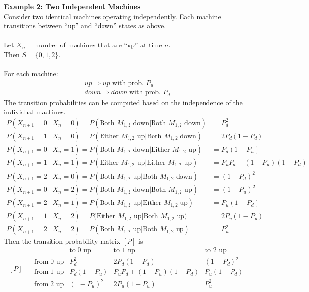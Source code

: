 \documentclass[12pt]{article}
\begin{document}
\noindent\textbf{Example 2: Two Independent Machines}\\
Consider two identical machines operating independently. Each machine transitions between ``up'' and ``down'' states as above. \\\\
Let $X_n$ = number of machines that are ``up'' at time $n$. \\
Then $S = \{0,1,2\}$. \\\\
For each machine:
\begin{align*}
    up \Rightarrow up \text{ with prob. } P_u\\
    down \Rightarrow down \text{ with prob. } P_d
\end{align*}
The transition probabilities can be computed based on the independence of the individual machines.
\begin{align*}
    P(X_{n+1} = 0 \mid X_{n} = 0) = P(\text{Both $M_{1,2}$ down} | \text{Both $M_{1,2}$ down}) &= P_d^2 \\
    P(X_{n+1} = 1 \mid X_{n} = 0) = P(\text{Either $M_{1,2}$ up} | \text{Both $M_{1,2}$ down})&= 2P_d(1-P_d)\\
    P(X_{n+1} = 0 \mid X_{n} = 1) = P(\text{Both $M_{1,2}$ down} | \text{Either $M_{1,2}$ up})&= P_d(1-P_u) \\
    P(X_{n+1} = 1 \mid X_{n} = 1) = P(\text{Either $M_{1,2}$ up} | \text{Either $M_{1,2}$ up}) &= P_uP_d + (1-P_u)(1-P_d)\\
    P(X_{n+1} = 2 \mid X_{n} = 0) = P(\text{Both $M_{1,2}$ up} | \text{Both $M_{1,2}$ down}) &= (1-P_d)^2\\
    P(X_{n+1} = 0 \mid X_{n} = 2) = P(\text{Both $M_{1,2}$ down} | \text{Both $M_{1,2}$ up})&= (1-P_u)^2\\
    P(X_{n+1} = 2 \mid X_{n} = 1) = P(\text{Both $M_{1,2}$ up} | \text{Either $M_{1,2}$ up})&=  P_u(1-P_d)\\
    P(X_{n+1} = 1 \mid X_{n} = 2) = P(\text{Either $M_{1,2}$ up} | \text{Both $M_{1,2}$ up)} &= 2P_u(1-P_u)\\
    P(X_{n+1} = 2 \mid X_{n} = 2) = P(\text{Both $M_{1,2}$ up} | \text{Both $M_{1,2}$ up}) &= P_u^2
\end{align*}
Then the transition probability matrix $[P]$ is 
\[
[P] = 
\begin{array}{c|ccc|ccc}
 & \text{to 0 up} & \text{to 1 up}  & \text{to 2 up} \\\hline
\text{from 0 up} & P_d^2 & 2P_d(1-P_d) & (1-P_d)^2 \\
\text{from 1 up} & P_d(1-P_u) & P_uP_d + (1-P_u)(1-P_d)& P_u(1-P_d)\\
\text{from 2 up} & (1-P_u)^2 & 2P_u(1-P_u) &P_u^2 \\
\end{array}
\]
\end{document}
